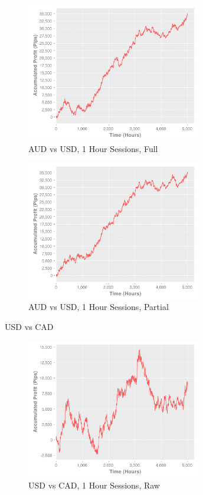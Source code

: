 \documentclass[letterpaper]{article}
\begin{document}
\begin{figure}[!t]
  \centering
  \includegraphics[width=3.0in]{audusd60-of}
  \caption{AUD vs USD, 1 Hour Sessions, Full}
  \label{audusd60-of}
\end{figure}

\begin{figure}[!t]
  \centering
  \includegraphics[width=3.0in]{audusd60-op}
  \caption{AUD vs USD, 1 Hour Sessions, Partial}
  \label{audusd60-op}
\end{figure}

USD vs CAD

\begin{figure}[!t]
  \centering
  \includegraphics[width=3.0in]{usdcad60-r}
  \caption{USD vs CAD, 1 Hour Sessions, Raw}
  \label{usdcad60-r}
\end{figure}
\end{document}
